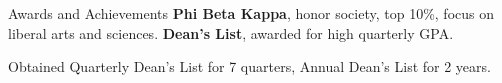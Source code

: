 \begin{rubric}{Awards and Achievements}
\entry*[2018] \textbf{Phi Beta Kappa}, honor society, top 10\%, focus on liberal arts and sciences.
\entry*[2016-2018] \textbf{Dean's List}, awarded for high quarterly GPA.
    \par Obtained Quarterly Dean's List for 7 quarters, Annual Dean's List for 2 years.
\end{rubric}